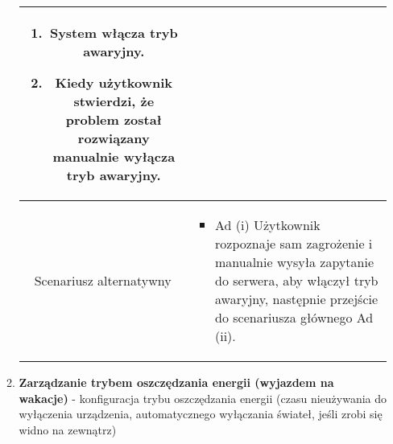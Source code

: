 \documentclass{article}
\begin{document}
\begin{enumerate}
\begin{enumerate}
\begin{table}[H]
\begin{tabular}{|c|p{7cm}|}
\begin{enumerate}
\item System włącza tryb awaryjny.

\item Kiedy użytkownik stwierdzi, że problem został rozwiązany manualnie wyłącza tryb awaryjny.\end{enumerate} \\
						\hline
						Scenariusz alternatywny & \begin{itemize}\item Ad (i) Użytkownik rozpoznaje sam zagrożenie i manualnie wysyła zapytanie do serwera, aby włączył tryb awaryjny, następnie przejście do scenariusza głównego Ad (ii).\end{itemize}                                                                       \\
						\hline
					\end{tabular}
				\end{table}

			\item \textbf{Zarządzanie trybem oszczędzania energii (wyjazdem na wakacje)}
				- konfiguracja trybu oszczędzania energii (czasu nieużywania do wyłączenia
				urządzenia, automatycznego wyłączania świateł, jeśli zrobi się widno na zewnątrz)


\end{enumerate}
\end{enumerate}
\end{document}

